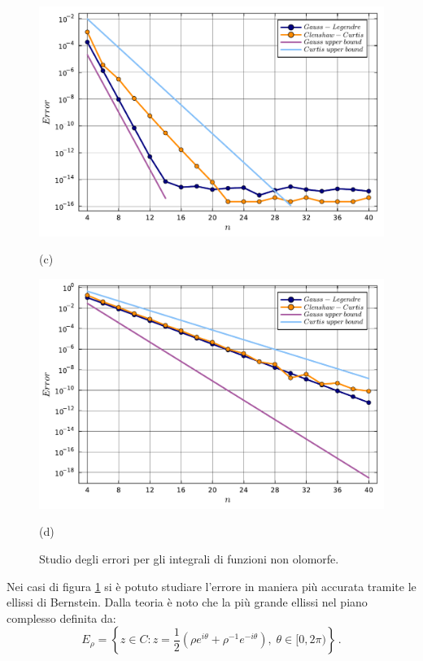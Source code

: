 \documentclass[letterpaper, 12pt]{article}
\numberwithin{equation}{section}    %
\begin{document}
\begin{figure}[!ht]
    \centering
    \begin{minipage}[b]{0.47\textwidth}
        \includegraphics[width=\textwidth]{5413.pdf}
        \caption*{(c)}
    \end{minipage}
    \hspace{0.5cm}
    \begin{minipage}[b]{0.47\textwidth}
        \includegraphics[width=\textwidth]{5414.pdf}
        \caption*{(d)}
    \end{minipage}
    \caption{Studio degli errori per gli integrali di funzioni non olomorfe.}
    \label{fig:es5_4_1_2}
\end{figure}

Nei casi di figura \ref{fig:es5_4_1_2} si è potuto studiare l'errore in maniera più accurata tramite le ellissi
di Bernstein. Dalla teoria è noto che la più grande ellissi nel piano complesso definita da: 
\begin{equation}
    E_\rho = \left\{ z \in C : z = \frac{1}{2} \left( \rho e^{i\theta} + \rho^{-1} e^{-i\theta} \right), \; \theta \in [0, 2\pi) \right\}\,.
\end{equation}
\end{document}
